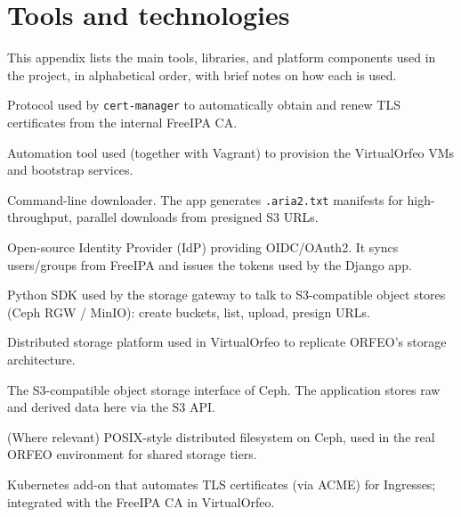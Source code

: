 \appendix

\chapter{Tools and technologies}\label{app:tools}

This appendix lists the main tools, libraries, and platform components used in the project, in alphabetical order, with brief notes on how each is used.

\begin{description}[style=nextline]
	
	\item[ACME]
	Protocol used by \texttt{cert-manager} to automatically obtain and renew TLS certificates from the internal FreeIPA CA.
	
	\item[Ansible]
	Automation tool used (together with Vagrant) to provision the VirtualOrfeo VMs and bootstrap services.
	
	\item[aria2]
	Command-line downloader. The app generates \texttt{.aria2.txt} manifests for high-throughput, parallel downloads from presigned S3 URLs.
	
	\item[Authentik]
	Open-source Identity Provider (IdP) providing OIDC/OAuth2. It syncs users/groups from FreeIPA and issues the tokens used by the Django app.
	
	\item[Boto3]
	Python SDK used by the storage gateway to talk to S3-compatible object stores (Ceph RGW / MinIO): create buckets, list, upload, presign URLs.
	
	\item[Ceph]
	Distributed storage platform used in VirtualOrfeo to replicate ORFEO’s storage architecture.
	
	\item[Ceph RADOS Gateway (RGW)]
	The S3-compatible object storage interface of Ceph. The application stores raw and derived data here via the S3 API.
	
	\item[CephFS]
	(Where relevant) POSIX-style distributed filesystem on Ceph, used in the real ORFEO environment for shared storage tiers.
	
	\item[cert-manager]
	Kubernetes add-on that automates TLS certificates (via ACME) for Ingresses; integrated with the FreeIPA CA in VirtualOrfeo.
	

\end{description}
